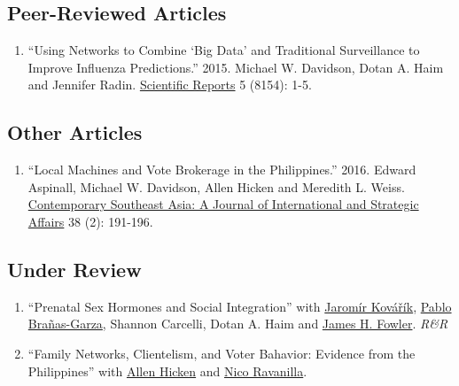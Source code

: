\documentclass[letterpaper]{article}
\begin{document}



\subsection*{Peer-Reviewed Articles}
\begin{enumerate}
\item ``Using Networks to Combine `Big Data' and Traditional Surveillance to Improve Influenza Predictions.''  2015. Michael W. Davidson, Dotan A. Haim and Jennifer Radin.
\href{http://www.nature.com/srep/2015/150129/srep08154/full/srep08154.html}{Scientific Reports} 5 (8154): 1-5.
\end{enumerate}

\subsection*{Other Articles}
\begin{enumerate}
\item ``Local Machines and Vote Brokerage in the Philippines.'' 2016. Edward Aspinall, Michael W. Davidson, Allen Hicken and Meredith L. Weiss. \href{https://muse.jhu.edu/article/628451/summary}{Contemporary Southeast Asia: A Journal of International and Strategic Affairs} 38 (2): 191-196.
\end{enumerate}

\subsection*{Under Review}
\begin{enumerate}
  \item ``Prenatal Sex Hormones and Social Integration'' with \href{https://sites.google.com/site/webpagesjaromir/}{Jarom\'{i}r Kov\'{a}\v{r}\'{i}k},
\href{https://sites.google.com/site/pablobranasgarza/home}{Pablo Bra\~{n}as-Garza}, Shannon Carcelli, Dotan A. Haim and \href{jhfowler.ucsd.edu}{James H. Fowler}. \emph{R\&R} 

\item ``Family Networks, Clientelism, and Voter Bahavior: Evidence from the Philippines'' with \href{http://www.allenhicken.com/}{Allen Hicken} and \href{http://www.nicoravanilla.com/}{Nico Ravanilla}.


\end{enumerate}
\end{document}
